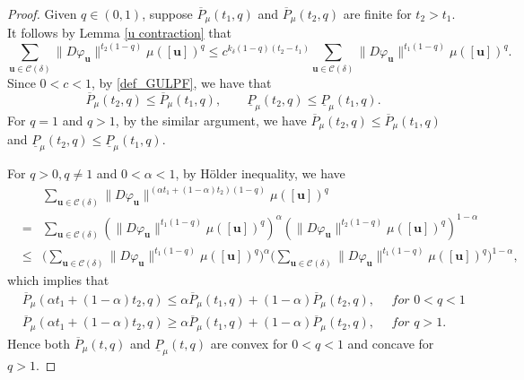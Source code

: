 \documentclass[10pt,a4paper]{amsart}
\newcommand{\bu}{\mathbf{u}}
\begin{document}
\begin{proof}
Given $q\in(0, 1)$,  suppose $\overline P_\mu(t_1, q)$ and $\overline P_\mu(t_2, q)$ are finite for $t_2>t_1$. It follows by Lemma \ref{u contraction} that
$$
\sum_{\mathbf{u}\in\mathcal{C}(\delta)}\|D\varphi_\mathbf{u}\|^{t_2(1-q)}\mu([\bu])^q
\le c^{k_\delta(1-q)(t_2-t_1)}\sum_{\mathbf{u}\in\mathcal{C}(\delta)}\|D\varphi_\mathbf{u}\|^{t_1(1-q)}\mu([\bu])^q. 
$$
Since $0<c<1$, by \eqref{def_GULPF},  we have that
$$
\overline P_\mu(t_2, q)\le\overline P_\mu(t_1, q),   \qquad  \underline P_\mu(t_2, q)\le\underline P_\mu(t_1, q).
$$
For $q=1$ and $q>1$,  by the similar argument,  we have  $\overline P_\mu(t_2, q) \leq  \overline P_\mu(t_1, q)$ and $\underline P_\mu(t_2, q)\le\underline P_\mu(t_1, q)$.

For $q>0, q\not=1$ and $0<\alpha<1$, by Hölder inequality, we have
\begin{eqnarray*}
&&\sum_{\mathbf{u}\in\mathcal{C}(\delta)}\|D\varphi_\mathbf{u}\|^{(\alpha t_1+(1-\alpha) t_2)(1-q)}\mu([\bu])^q   \\
&=&\sum_{\mathbf{u}\in\mathcal{C}(\delta)}(\|D\varphi_\mathbf{u}\|^{t_1(1-q)}\mu([\bu])^q)^\alpha(\|D\varphi_\mathbf{u}\|^{t_2(1-q)}\mu([\bu])^q)^{1-\alpha}  \\
&\le&\Big(\sum_{\mathbf{u}\in\mathcal{C}(\delta)}\|D\varphi_\mathbf{u}\|^{ t_1(1-q)}\mu([\bu])^q\Big)^\alpha \Big(\sum_{\mathbf{u}\in\mathcal{C}(\delta)}\|D\varphi_\mathbf{u}\|^{ t_1(1-q)}\mu([\bu])^q \Big)^{1-\alpha},
\end{eqnarray*}
which implies that 
\begin{equation*}\begin{split}
&\overline P_\mu(\alpha t_1+(1-\alpha) t_2, q)\le\alpha \overline P_\mu(t_1, q)+(1-\alpha)\overline P_\mu( t_2, q), \quad \textit{ for $0<q<1$} \\ 
&\overline P_\mu(\alpha t_1+(1-\alpha) t_2, q)\ge\alpha \overline P_\mu(t_1, q)+(1-\alpha)\overline P_\mu( t_2, q) ,  \quad \textit{ for $q>1$}. 
\end{split}
\end{equation*}
  Hence both $\overline P_\mu(t, q)$ and  $\underline P_\mu(t, q)$  are   convex  for $0<q<1$ and  concave   for $q>1$.
\end{proof}
\end{document}
